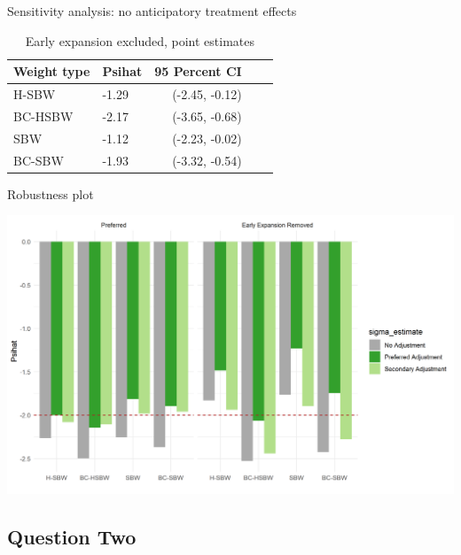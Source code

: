 \documentclass[hyperref={pdfpagelabels=false}]{beamer}
\begin{document}
\begin{frame}{Sensitivity analysis: no anticipatory treatment effects}
    \begin{table}[ht]
\centering
\begin{tabular}{llrll}
  \toprule
Weight type & Psihat & 95 Percent CI \\ 
  \midrule
H-SBW & -1.29 & (-2.45, -0.12) \\ 
BC-HSBW & -2.17 & (-3.65, -0.68) \\ 
SBW & -1.12 & (-2.23, -0.02) \\ 
BC-SBW & -1.93 & (-3.32, -0.54) \\ 
   \bottomrule
\end{tabular}
\caption{Early expansion excluded, point estimates}
\label{tab:confintmainc2}
\end{table}
\end{frame}

\begin{frame}{Robustness plot}

\begin{center}
	\includegraphics[scale=0.5]{01_Plots/all-estimates-c1c2.png}
\end{center}
\end{frame}

\subsection{Question Two}
\end{document}
